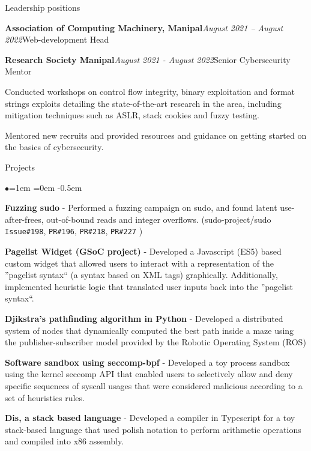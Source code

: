 \documentclass{resume} %
\begin{document}
\begin{rSection}{Leadership positions}
\begin{rSubsection}{\bf Association of Computing Machinery, Manipal}{\em August 2021 -- August 2022}{Web-development Head}{}
\end{rSubsection}
\begin{rSubsection}{\bf Research Society Manipal}{\em August 2021 - August 2022}{Senior Cybersecurity Mentor}{}
\item Conducted workshops on control flow integrity, binary exploitation and format strings exploits detailing the state-of-the-art research in the area, including mitigation techniques such as ASLR, stack cookies and fuzzy testing.
\item Mentored new recruits and provided resources and guidance on getting started on the basics of cybersecurity.
\end{rSubsection}
\end{rSection}
\begin{rSection}{Projects}
\begin{list}{$\bullet$}{\leftmargin=1em \itemindent=0em}
   \itemsep -0.5em
   \item {\bf Fuzzing sudo} - Performed a fuzzing campaign on sudo, and found latent use-after-frees, out-of-bound reads and integer overflows. (sudo-project/sudo \texttt{Issue\#198}, \texttt{PR\#196}, \texttt{PR\#218}, \texttt{PR\#227} )
   \item {\bf Pagelist Widget (GSoC project)} - Developed a Javascript (ES5) based custom widget that allowed users to interact with a representation of the ''pagelist syntax`` (a syntax based on XML tags) graphically. Additionally, implemented heuristic logic that translated user inputs back into the ''pagelist syntax``.

\item {\bf Djikstra's pathfinding algorithm in Python} - Developed a distributed system of nodes that dynamically computed the best path inside a maze using the publisher-subscriber model provided by the Robotic Operating System (ROS)

\item {\bf Software sandbox using seccomp-bpf} - Developed a toy process sandbox using the kernel seccomp API that enabled users to selectively allow and deny specific sequences of syscall usages that were considered malicious according to a set of heuristics rules.
\item {\bf Dis, a stack based language } - Developed a compiler in Typescript for a toy stack-based language that used polish notation to perform arithmetic operations and compiled into x86 assembly.
\end{list}

\end{rSection}
\end{document}
